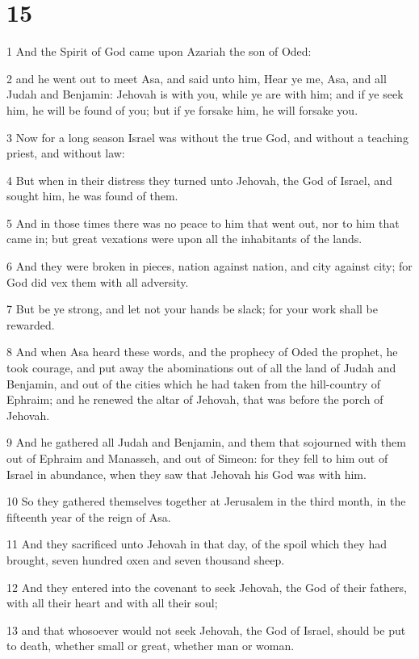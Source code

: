 \chapter{15}

\par 1 And the Spirit of God came upon Azariah the son of Oded:
\par 2 and he went out to meet Asa, and said unto him, Hear ye me, Asa, and all Judah and Benjamin: Jehovah is with you, while ye are with him; and if ye seek him, he will be found of you; but if ye forsake him, he will forsake you.
\par 3 Now for a long season Israel was without the true God, and without a teaching priest, and without law:
\par 4 But when in their distress they turned unto Jehovah, the God of Israel, and sought him, he was found of them.
\par 5 And in those times there was no peace to him that went out, nor to him that came in; but great vexations were upon all the inhabitants of the lands.
\par 6 And they were broken in pieces, nation against nation, and city against city; for God did vex them with all adversity.
\par 7 But be ye strong, and let not your hands be slack; for your work shall be rewarded.
\par 8 And when Asa heard these words, and the prophecy of Oded the prophet, he took courage, and put away the abominations out of all the land of Judah and Benjamin, and out of the cities which he had taken from the hill-country of Ephraim; and he renewed the altar of Jehovah, that was before the porch of Jehovah.
\par 9 And he gathered all Judah and Benjamin, and them that sojourned with them out of Ephraim and Manasseh, and out of Simeon: for they fell to him out of Israel in abundance, when they saw that Jehovah his God was with him.
\par 10 So they gathered themselves together at Jerusalem in the third month, in the fifteenth year of the reign of Asa.
\par 11 And they sacrificed unto Jehovah in that day, of the spoil which they had brought, seven hundred oxen and seven thousand sheep.
\par 12 And they entered into the covenant to seek Jehovah, the God of their fathers, with all their heart and with all their soul;
\par 13 and that whosoever would not seek Jehovah, the God of Israel, should be put to death, whether small or great, whether man or woman.
